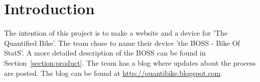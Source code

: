  
\section{Introduction}
The intention of this project is to make a website and a device for 'The Quantified Bike'.
The team chose to name their device 'the BOSS - Bike Of StatS'. A more detailed description of the BOSS can be found
in Section~\ref{section:product}. The team has a blog where updates about the process are posted. The blog can be
found at \url{http://quantibike.blogspot.com}.